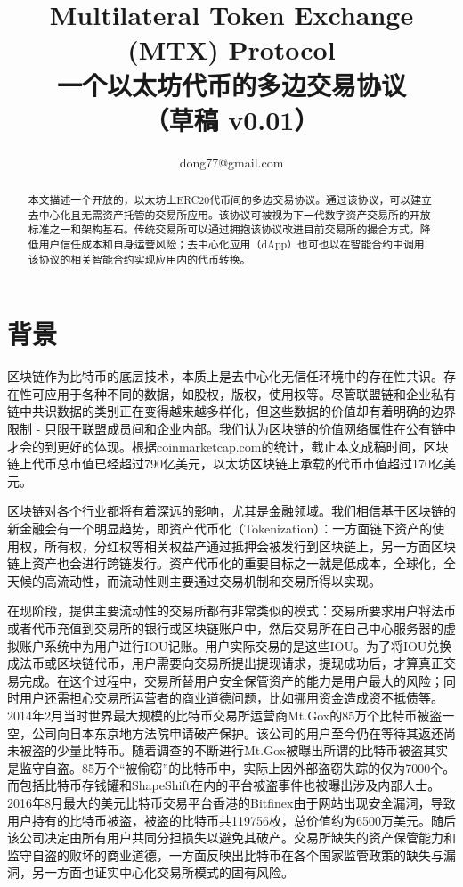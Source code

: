 \documentclass[UTF8,nofonts]{ctexart}
\title{Multilateral Token Exchange (MTX) Protocol\\一个以太坊代币的多边交易协议\\（草稿 v0.01）}
\author{ 
    dong77@gmail.com
}
\begin{document}
\maketitle

\begin{abstract}
本文描述一个开放的，以太坊上ERC20代币间的多边交易协议。通过该协议，可以建立去中心化且无需资产托管的交易所应用。该协议可被视为下一代数字资产交易所的开放标准之一和架构基石。传统交易所可以通过拥抱该协议改进目前交易所的撮合方式，降低用户信任成本和自身运营风险；去中心化应用（dApp）也可也以在智能合约中调用该协议的相关智能合约实现应用内的代币转换。

\end{abstract}

\newpage

\tableofcontents
\newpage

\section{背景\label{sec:background}}

区块链作为比特币的底层技术，本质上是去中心化无信任环境中的存在性共识。存在性可应用于各种不同的数据，如股权，版权，使用权等。尽管联盟链和企业私有链中共识数据的类别正在变得越来越多样化，但这些数据的价值却有着明确的边界限制 - 只限于联盟成员间和企业内部。我们认为区块链的价值网络属性在公有链中才会的到更好的体现。根据coinmarketcap.com的统计，截止本文成稿时间，区块链上代币总市值已经超过790亿美元，以太坊区块链上承载的代币市值超过170亿美元。

区块链对各个行业都将有着深远的影响，尤其是金融领域。我们相信基于区块链的新金融会有一个明显趋势，即资产代币化（Tokenization）：一方面链下资产的使用权，所有权，分红权等相关权益产通过抵押会被发行到区块链上，另一方面区块链上资产也会进行跨链发行。资产代币化的重要目标之一就是低成本，全球化，全天候的高流动性，而流动性则主要通过交易机制和交易所得以实现。

在现阶段，提供主要流动性的交易所都有非常类似的模式：交易所要求用户将法币或者代币充值到交易所的银行或区块链账户中，然后交易所在自己中心服务器的虚拟账户系统中为用户进行IOU记账。用户实际交易的是这些IOU。为了将IOU兑换成法币或区块链代币，用户需要向交易所提出提现请求，提现成功后，才算真正交易完成。在这个过程中，交易所替用户安全保管资产的能力是用户最大的风险；同时用户还需担心交易所运营者的商业道德问题，比如挪用资金造成资不抵债等。2014年2月当时世界最大规模的比特币交易所运营商Mt.Gox的85万个比特币被盗一空，公司向日本东京地方法院申请破产保护。该公司的用户至今仍在等待其返还尚未被盗的少量比特币。随着调查的不断进行Mt.Gox被曝出所谓的比特币被盗其实是监守自盗。85万个“被偷窃”的比特币中，实际上因外部盗窃失踪的仅为7000个。而包括比特币存钱罐和ShapeShift在内的平台被盗事件也被曝出涉及内部人士。2016年8月最大的美元比特币交易平台香港的Bitfinex由于网站出现安全漏洞，导致用户持有的比特币被盗，被盗的比特币共119756枚，总价值约为6500万美元。随后该公司决定由所有用户共同分担损失以避免其破产。交易所缺失的资产保管能力和监守自盗的败坏的商业道德，一方面反映出比特币在各个国家监管政策的缺失与漏洞，另一方面也证实中心化交易所模式的固有风险。
\end{document}
